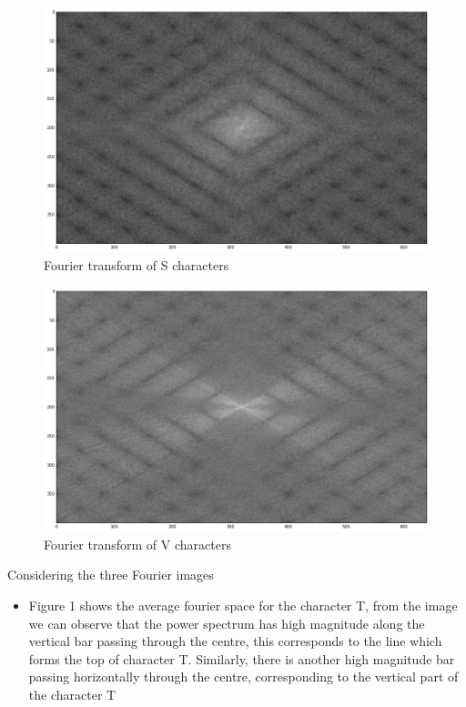 \documentclass[a4paper,12px,twocolumn]{article}
\begin{document}
\begin{flushleft}
\begin{figure}[h!]
  \caption{Fourier transform of S characters}
  \includegraphics[scale=0.25]{fourierS}
\end{figure}

\begin{figure}[h!]
  \caption{Fourier transform of V characters}
  \includegraphics[scale=0.25]{fourierV}
\end{figure}




\smallskip
\newpage

Considering the three Fourier images
\begin{itemize}
    \item Figure 1 shows the average fourier space for the character T, from the image we
    can observe that the power spectrum has high magnitude along the vertical bar passing through the centre,
    this corresponds to the line which forms the top of character T. Similarly, there is another high magnitude bar passing horizontally
    through the centre, corresponding to the vertical part of the character T


\end{itemize}
\end{flushleft}
\end{document}
